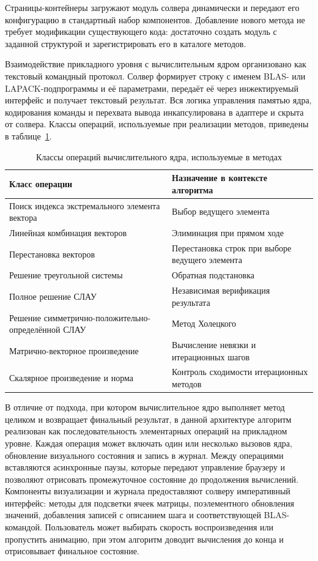 \documentclass[12pt, oneside]{book}
\begin{document}
    \quad Страницы-контейнеры загружают модуль солвера динамически и передают его конфигурацию в стандартный набор компонентов. Добавление нового метода не требует модификации существующего кода: достаточно создать модуль с заданной структурой и зарегистрировать его в каталоге методов.

    \quad Взаимодействие прикладного уровня с вычислительным ядром организовано как текстовый командный протокол. Солвер формирует строку с именем BLAS- или LAPACK-подпрограммы и её параметрами, передаёт её через инжектируемый интерфейс и получает текстовый результат. Вся логика управления памятью ядра, кодирования команды и перехвата вывода инкапсулирована в адаптере и скрыта от солвера. Классы операций, используемые при реализации методов, приведены в таблице~\ref{tab:blas_commands}.

\begin{table}[htbp]
\centering
\scriptsize
\renewcommand{\arraystretch}{1.15}
\begin{tabular}{|p{6.0cm}|p{6.5cm}|}
\hline
\rowcolor{thbg} \textbf{Класс операции} & \textbf{Назначение в контексте алгоритма} \\
\hline
Поиск индекса экстремального элемента вектора & Выбор ведущего элемента \\
\hline
Линейная комбинация векторов & Элиминация при прямом ходе \\
\hline
Перестановка векторов & Перестановка строк при выборе ведущего элемента \\
\hline
Решение треугольной системы & Обратная подстановка \\
\hline
Полное решение СЛАУ & Независимая верификация результата \\
\hline
Решение симметрично-положительно-определённой СЛАУ & Метод Холецкого \\
\hline
Матрично-векторное произведение & Вычисление невязки и итерационных шагов \\
\hline
Скалярное произведение и норма & Контроль сходимости итерационных методов \\
\hline
\end{tabular}
\caption{Классы операций вычислительного ядра, используемые в методах}
\label{tab:blas_commands}
\end{table}

    \quad В отличие от подхода, при котором вычислительное ядро выполняет метод целиком и возвращает финальный результат, в данной архитектуре алгоритм реализован как последовательность элементарных операций на прикладном уровне. Каждая операция может включать один или несколько вызовов ядра, обновление визуального состояния и запись в журнал. Между операциями вставляются асинхронные паузы, которые передают управление браузеру и позволяют отрисовать промежуточное состояние до продолжения вычислений. Компоненты визуализации и журнала предоставляют солверу императивный интерфейс: методы для подсветки ячеек матрицы, поэлементного обновления значений, добавления записей с описанием шага и соответствующей BLAS-командой. Пользователь может выбирать скорость воспроизведения или пропустить анимацию, при этом алгоритм доводит вычисления до конца и отрисовывает финальное состояние.
\end{document}
